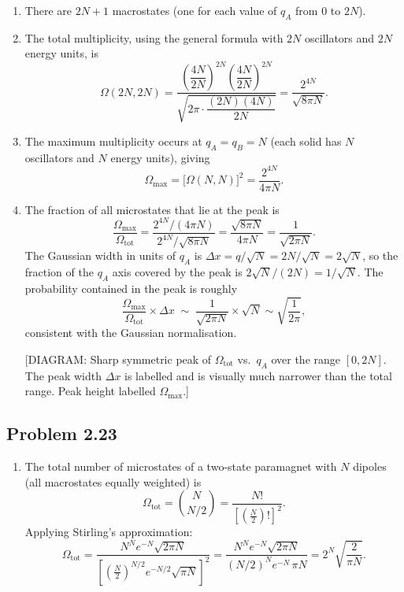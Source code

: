 \begin{enumerate}[label=\alph*)]
  \item There are $2N+1$ macrostates (one for each value of $q_A$ from $0$ to $2N$).

  \item The total multiplicity, using the general formula with $2N$ oscillators and $2N$
    energy units, is
    \[
      \Omega(2N, 2N)
      = \frac{\left(\dfrac{4N}{2N}\right)^{2N}\!\left(\dfrac{4N}{2N}\right)^{2N}}
             {\sqrt{2\pi\cdot\dfrac{(2N)(4N)}{2N}}}
      = \frac{2^{4N}}{\sqrt{8\pi N}}.
    \]

  \item The maximum multiplicity occurs at $q_A = q_B = N$ (each solid has $N$
    oscillators and $N$ energy units), giving
    \[
      \Omega_{\max} = \bigl[\Omega(N,N)\bigr]^2 = \frac{2^{4N}}{4\pi N}.
    \]

  \item The fraction of all microstates that lie at the peak is
    \[
      \frac{\Omega_{\max}}{\Omega_{\text{tot}}}
      = \frac{2^{4N}/(4\pi N)}{2^{4N}/\sqrt{8\pi N}}
      = \frac{\sqrt{8\pi N}}{4\pi N}
      = \frac{1}{\sqrt{2\pi N}}.
    \]
    The Gaussian width in units of $q_A$ is $\Delta x = q/\sqrt{N} = 2N/\sqrt{N} =
    2\sqrt{N}$, so the fraction of the $q_A$ axis covered by the peak is $2\sqrt{N}/
    (2N) = 1/\sqrt{N}$.  The probability contained in the peak is roughly
    \[
      \frac{\Omega_{\max}}{\Omega_{\text{tot}}} \times \Delta x
      \;\sim\; \frac{1}{\sqrt{2\pi N}} \times \sqrt{N}
      \sim \sqrt{\frac{1}{2\pi}},
    \]
    consistent with the Gaussian normalisation.

    \begin{center}
    [DIAGRAM: Sharp symmetric peak of $\Omega_{\text{tot}}$ vs.\ $q_A$ over the range
    $[0,2N]$.  The peak width $\Delta x$ is labelled and is visually much narrower than
    the total range.  Peak height labelled $\Omega_{\max}$.]
    \end{center}
\end{enumerate}

\subsection*{Problem 2.23}

\begin{enumerate}[label=\alph*)]
  \item The total number of microstates of a two-state paramagnet with $N$ dipoles
    (all macrostates equally weighted) is
    \[
      \Omega_{\text{tot}}
      = \binom{N}{N/2}
      = \frac{N!}{\left[\left(\tfrac{N}{2}\right)!\right]^2}.
    \]
    Applying Stirling's approximation:
    \[
      \Omega_{\text{tot}}
      = \frac{N^N e^{-N}\sqrt{2\pi N}}
             {\left[\left(\tfrac{N}{2}\right)^{N/2} e^{-N/2}\sqrt{\pi N}\right]^2}
      = \frac{N^N e^{-N}\sqrt{2\pi N}}
             {(N/2)^N e^{-N}\,\pi N}
      = 2^N\sqrt{\frac{2}{\pi N}}.
    \]
\end{enumerate}
